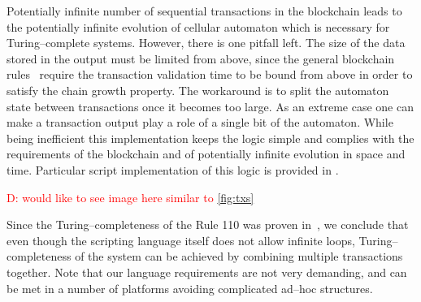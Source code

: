 \documentclass[runningheads]{llncs}
\newcommand{\dnote}[1]{\textcolor{red}{D: {#1}}}
\begin{document}
    Potentially infinite number of sequential transactions in the
    blockchain leads to the potentially infinite evolution of cellular
    automaton which is necessary for Turing--complete systems.
    However, there is one pitfall left.
    The size of the data stored in the output must be limited from above, since
    the general blockchain rules~\cite{garay2015bitcoin} require the transaction validation
    time to be bound from above in order to satisfy the
    chain growth property. The workaround is to split
    the automaton state between transactions once it becomes too large. As an
    extreme case one can make a transaction output play a role of a single bit
    of the automaton. While being inefficient this implementation keeps
    the logic simple and complies with the requirements of the blockchain and
    of potentially infinite evolution in space and time. Particular script
    implementation of this logic is provided in .

    \dnote{would like to see image here similar to \ref{fig:txs}}

    Since the Turing--completeness of the Rule 110 was proven
    in~\cite{cook2004universality}, we conclude that even though the scripting
    language itself does not allow infinite loops, Turing--completeness of the
    system can be achieved by combining multiple transactions together. Note
    that our language requirements are not very demanding, and can be met in a
    number of platforms avoiding complicated ad--hoc structures.
\end{document}
